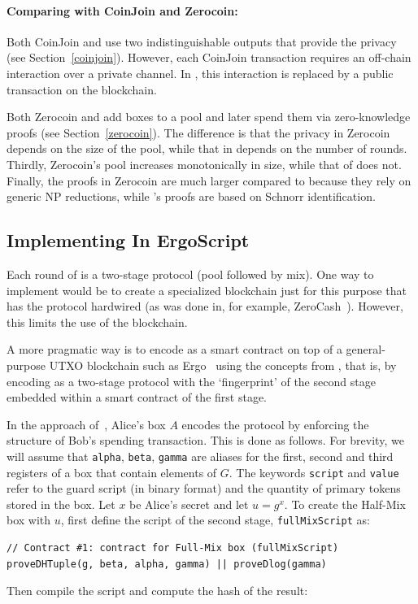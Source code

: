 \documentclass[runningheads]{llncs}
\newcommand{\langname}{ErgoScript\xspace}
\newcommand{\zerocoin}{Zerocoin\xspace}
\begin{document}
\paragraph{Comparing with CoinJoin and \zerocoin:} Both CoinJoin and \algname use two indistinguishable outputs that provide the privacy (see Section~\ref{coinjoin}). However, each CoinJoin transaction requires an off-chain interaction over a private channel. In \algname, this interaction is replaced by a public transaction on the blockchain. 


Both \zerocoin and \algname add boxes to a pool and later spend them via zero-knowledge proofs (see Section~\ref{zerocoin}). 
The difference is that the privacy in \zerocoin depends on the size of the pool, while that in \algname depends on the number of rounds. Thirdly, \zerocoin's pool increases monotonically in size, while that of \algname does not. Finally, the proofs in \zerocoin are much larger compared to \algname because they rely on generic NP reductions, while \algname's proofs are based on Schnorr identification. 

\subsection{Implementing \algname In \langname}
\label{impl}
Each round of \algname is a two-stage protocol (pool followed by mix). One way to implement \algname would be to create a specialized blockchain just for this purpose that has the protocol hardwired (as was done in, for example, ZeroCash~\cite{zcash}). However, this limits the use of the blockchain. 

A more pragmatic way is to encode \algname as a smart contract on top of a general-purpose UTXO blockchain such as Ergo~\cite{ergo} using the concepts from \cite{multistage}, that is, by encoding \algname as a two-stage protocol with the `fingerprint' of the second stage embedded within a smart contract of the first stage.

In the approach of~\cite{multistage}, Alice's box $A$ encodes the protocol by enforcing the structure of Bob's spending transaction. 
This is done as follows. For brevity, we will assume that \texttt{alpha}, \texttt{beta}, \texttt{gamma} are aliases for the first, second and third registers of a box that contain elements of $G$. The keywords \texttt{script} and \texttt{value} refer to the guard script (in binary format) and the quantity of primary tokens stored in the box. Let $x$ be Alice's secret and let $u = g^x$. To create the Half-Mix box with $u$, first define the script of the second stage, \texttt{fullMixScript} as:
{\small
\begin{Verbatim}[frame=single]
// Contract #1: contract for Full-Mix box (fullMixScript)
proveDHTuple(g, beta, alpha, gamma) || proveDlog(gamma)
\end{Verbatim}
}
Then compile the script and compute the hash of the result:
\end{document}
